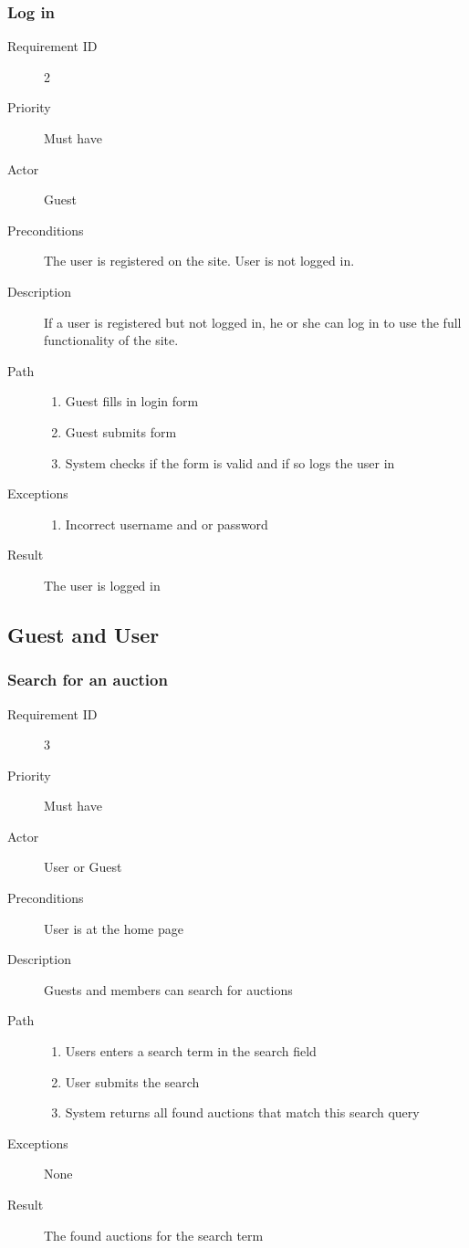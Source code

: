 		\subsubsection{Log in}
			\begin{description}
				\item[Requirement ID] 2
				\item[Priority] Must have
				\item[Actor] Guest
				\item[Preconditions] The user is registered on the site.
				User is not logged in.
				\item[Description]
				If a user is registered but not logged in, he or she can
				log in to use the full functionality of the site.
				\item[Path]
 					\begin{enumerate}
						\item Guest fills in login form
						\item Guest submits form
						\item System checks if the form is valid and if so logs
						the user in
					\end{enumerate}
				\item[Exceptions]
					\begin{enumerate}
						\item Incorrect username and or password
					\end{enumerate}
				\item[Result] The user is logged in
			\end{description}
	\subsection{Guest and User}
		\subsubsection{Search for an auction}
			\begin{description}
				\item[Requirement ID] 3
				\item[Priority] Must have
				\item[Actor] User or Guest
				\item[Preconditions] User is at the home page
				\item[Description] Guests and members can search for auctions
				\item[Path]
 					\begin{enumerate}
						\item Users enters a search term in the search field
						\item User submits the search
						\item System returns all found auctions that match this search
						query
					\end{enumerate}
				\item[Exceptions] None
				\item[Result] The found auctions for the search term
			\end{description}
